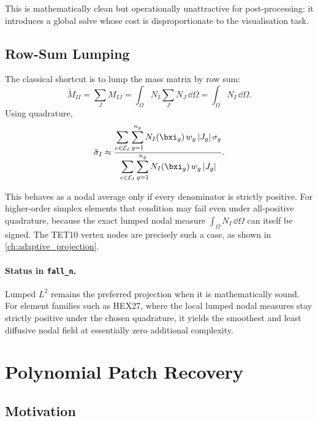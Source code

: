 This is mathematically clean but operationally unattractive for
post-processing: it introduces a global solve whose cost is disproportionate
to the visualisation task.

\subsection{Row-Sum Lumping}
\label{sec:lumping}

The classical shortcut is to lump the mass matrix by row sum:
\begin{equation}
  \tilde{M}_{II}
  = \sum_J M_{IJ}
  = \int_\Omega N_I \sum_J N_J \,\dd\Omega
  = \int_\Omega N_I \,\dd\Omega.
  \label{eq:lumped_mass}
\end{equation}
Using quadrature,
\begin{equation}
  \tilde{\sigma}_I
  \approx
  \frac{\displaystyle\sum_{e \in \mathcal{E}_I}
        \sum_{g=1}^{n_g} N_I(\bxi_g)\, w_g\, |J_g|\, \sigma_g}
       {\displaystyle\sum_{e \in \mathcal{E}_I}
        \sum_{g=1}^{n_g} N_I(\bxi_g)\, w_g\, |J_g|}.
  \label{eq:lumped_L2_final}
\end{equation}

This behaves as a nodal average only if every denominator is strictly
positive.  For higher-order simplex elements that condition may fail even
under all-positive quadrature, because the exact lumped nodal measure
$\int_\Omega N_I \,\dd\Omega$ can itself be signed.  The TET10 vertex nodes
are precisely such a case, as shown in \cref{ch:adaptive_projection}.

\paragraph{Status in \texttt{fall\_n}.}
Lumped $L^2$ remains the preferred projection when it is mathematically sound.
For element families such as HEX27, where the local lumped nodal measures stay
strictly positive under the chosen quadrature, it yields the smoothest and
least diffusive nodal field at essentially zero additional complexity.


\section{Polynomial Patch Recovery}
\label{sec:projection_patch}

\subsection{Motivation}

